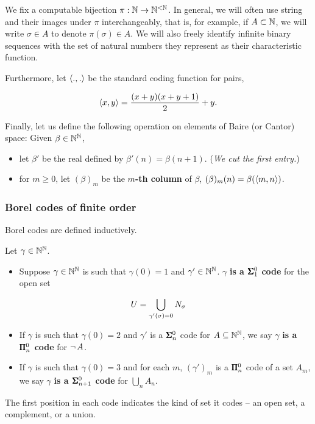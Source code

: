 We fix a computable bijection $\pi: \mathbb{N} \to \mathbb{N}^{<\mathbb{N}}$. In general, we will often use string and their images under $\pi$ interchangeably, that is, for example, if $A \subset \mathbb{N}$, we will write $\sigma \in A$ to denote $\pi(\sigma) \in A$.
We will also freely identify infinite binary sequences with the set of natural numbers they represent as their characteristic function.

Furthermore, let $\langle .,. \rangle$ be the standard coding function for pairs,

\begin{equation}
\langle x,y \rangle = \frac{(x+y)(x+y+1)}{2}+y.
\end{equation}

Finally, let us define the following operation on elements of Baire (or Cantor) space: Given $\beta\in \mathbb{N}^{\mathbb{N}}$,

\begin{itemize}
\item let $\beta'$ be the real defined by $\beta'(n) = \beta(n+1)$. (\textit{We cut the first entry.})
\item for $m \geq 0$, let $(\beta)_m$ be the \textbf{$m$-th column} of $\beta$, $(\beta)_m(n) = \beta(\langle m,n \rangle)$.
\end{itemize}

\subsubsection{Borel codes of finite order}

Borel codes are defined inductively.

\begin{definition}\label{def-borel-codes}Let $\gamma \in \mathbb{N}^{\mathbb{N}}$.

\begin{itemize}
\item Suppose $\gamma \in \mathbb{N}^{\mathbb{N}}$ is such that $\gamma(0) = 1$ and $\gamma' \in \mathbb{N}^{\mathbb{N}}$. $\gamma$ \textbf{is a $\pmb{\Sigma}^0_1$ code} for the open set
\end{itemize}
\begin{equation*}
U = \bigcup_{\gamma'(\sigma) = 0} N_{\sigma}
\end{equation*}

\begin{itemize}
\item If $\gamma$ is such that $\gamma(0)=2$ and $\gamma'$ is a $\pmb{\Sigma}^0_n$ code for $A \subseteq \mathbb{N}^{\mathbb{N}}$, we say $\gamma$ \textbf{is a $\pmb{\Pi}^0_n$ code} for $\neg \, A$.


\item If $\gamma$ is such that $\gamma(0)=3$ and for each $m$, $(\gamma')_m$ is a $\pmb{\Pi}^0_n$ code of a set $A_m$, we say $\gamma$ \textbf{is a $\pmb{\Sigma}^0_{n+1}$ code} for $\bigcup_n A_n$.
\end{itemize}

\end{definition}The first position in each code indicates the kind of set it codes -- an open set, a complement, or a union.

